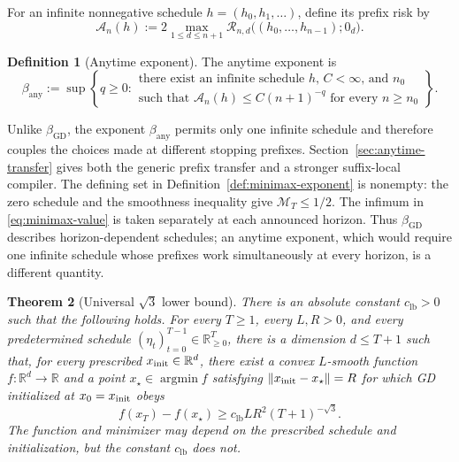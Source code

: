 \documentclass[11pt]{article}
\newtheorem{theorem}{Theorem}[section]
\theoremstyle{definition}
\newtheorem{definition}[theorem]{Definition}
\theoremstyle{remark}
\newcommand{\R}{\mathbb{R}}
\newcommand{\gdexp}{\beta_{\mathrm{GD}}}
\newcommand{\anyexp}{\beta_{\mathrm{any}}}
\newcommand{\anyrisk}{\mathcal A}
\newcommand{\argmin}{\operatorname*{argmin}}
\newcommand{\lbconst}{c_{\mathrm{lb}}}
\begin{document}
For an infinite nonnegative schedule \(h=(h_0,h_1,\ldots)\), define its
prefix risk by
\begin{equation}
 \anyrisk_n(h)
 :=2\max_{1\le d\le n+1}
 \mathcal R_{n,d}\bigl((h_0,\ldots,h_{n-1});0_d\bigr).
 \label{eq:anytime-prefix-risk}
\end{equation}

\begin{definition}[Anytime exponent]
\label{def:anytime-exponent}
The anytime exponent is
\begin{equation}
 \anyexp
 :=\sup\left\{q\ge0:
 \begin{array}{l}
 \text{there exist an infinite schedule \(h\), \(C<\infty\), and \(n_0\)}\\[-1mm]
 \text{such that \(\anyrisk_n(h)\le C(n+1)^{-q}\) for every \(n\ge n_0\)}
 \end{array}
 \right\}.
 \label{eq:anytime-exponent}
\end{equation}
\end{definition}

Unlike \(\gdexp\), the exponent \(\anyexp\) permits only one infinite
schedule and therefore couples the choices made at different stopping
prefixes.  Section~\ref{sec:anytime-transfer} gives both the generic prefix
transfer and a stronger suffix-local compiler.
The defining set in Definition~\ref{def:minimax-exponent} is nonempty: the zero schedule and the smoothness
inequality give \(\mathcal M_T\le1/2\).  The infimum in
\eqref{eq:minimax-value} is taken separately at each announced horizon.
Thus \(\gdexp\) describes horizon-dependent schedules; an
anytime exponent, which would require one infinite schedule whose prefixes
work simultaneously at every horizon, is a different quantity.

\begin{theorem}[Universal \(\sqrt3\) lower bound]
\label{thm:main}
There is an absolute constant \(\lbconst>0\) such that the following holds.
For every \(T\ge1\), every \(L,R>0\), and every predetermined schedule
\((\eta_t)_{t=0}^{T-1}\in\R_{\ge0}^T\), there is a dimension
\(d\le T+1\) such that, for every prescribed
\(x_{\rm init}\in\R^d\), there exist a convex \(L\)-smooth function
\(f:\R^d\to\R\) and a point \(x_\star\in\argmin f\) satisfying
\(\|x_{\rm init}-x_\star\|=R\) for which GD initialized at
\(x_0=x_{\rm init}\) obeys
\begin{equation}
 f(x_T)-f(x_\star)
 \ge \lbconst LR^2(T+1)^{-\sqrt3}.
 \label{eq:main-bound}
\end{equation}
The function and minimizer may depend on the prescribed schedule and
initialization, but the constant \(\lbconst\) does not.
\end{theorem}
\end{document}
